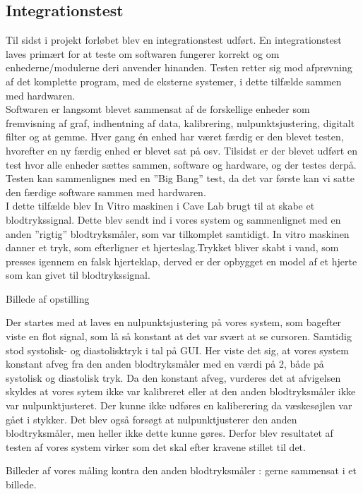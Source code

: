 \subsection{Integrationstest}
Til sidst i projekt forløbet blev en integrationstest\cite{Integration} udført. En integrationstest laves primært for at teste om softwaren fungerer korrekt og om enhederne/modulerne deri anvender hinanden. Testen retter sig mod afprøvning af det komplette program, med de eksterne systemer, i dette tilfælde sammen med hardwaren.\\
Softwaren er langsomt blevet sammensat af de forskellige enheder som fremvisning af graf, indhentning af data, kalibrering, nulpunktsjustering, digitalt filter og at gemme. Hver gang én enhed har været færdig er den blevet testen, hvorefter en ny færdig enhed er blevet sat på osv. Tilsidst er der blevet udført  en test hvor alle enheder sættes sammen, software og hardware,  og der testes derpå. Testen kan sammenlignes med en ”Big Bang” test, da det var første kan vi satte den færdige software sammen med hardwaren.\\  
I dette tilfælde blev In Vitro maskinen i Cave Lab brugt til at skabe et blodtrykssignal. Dette blev sendt ind i vores system og sammenlignet med en anden ”rigtig” blodtryksmåler, som var tilkomplet samtidigt.  In vitro maskinen danner et tryk, som efterligner et hjerteslag.Trykket bliver skabt i vand, som presses igennem en falsk hjerteklap, derved er der opbygget en model af et hjerte som kan givet til blodtrykssignal. 

Billede af opstilling

Der startes med at laves en nulpunktsjustering på vores system, som bagefter viste en flot signal, som lå så konstant at det var svært at se cursoren. Samtidig stod systolisk- og diastolisktryk i tal på GUI. Her viste det sig, at vores system konstant afveg fra den anden blodtryksmåler med en værdi på 2, både på systolisk og diastolisk tryk. Da den konstant afveg, vurderes det at afvigelsen skyldes at vores sytem ikke var kalibreret eller at den anden blodtryksmåler ikke var nulpunktjusteret.  Der kunne ikke udføres en kaliberering da væskesøjlen var gået i stykker. Det blev også forsøgt at nulpunktjusterer den anden blodtryksmåler, men heller ikke dette kunne gøres.  Derfor blev resultatet af testen af vores system virker som det skal efter kravene stillet til det.  

Billeder af vores måling kontra den anden blodtryksmåler : gerne sammensat i et billede. 
